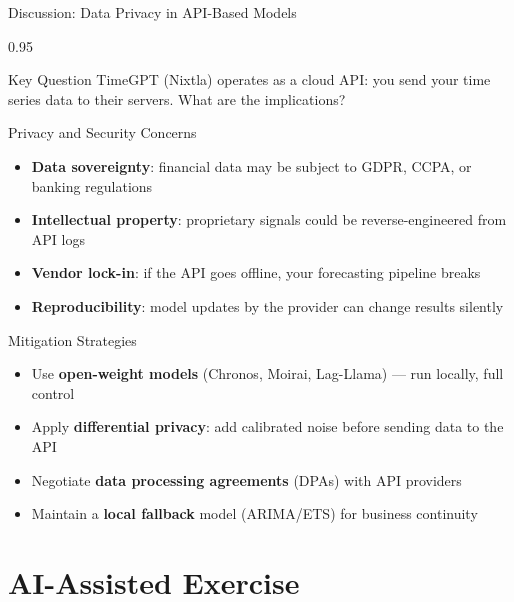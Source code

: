 \documentclass[9pt, aspectratio=169, t]{beamer}
\begin{document}
\begin{frame}{Discussion: Data Privacy in API-Based Models}
    \begin{cminipage}{0.95\textwidth}
    {\footnotesize
    \begin{alertblock}{Key Question}
        TimeGPT (Nixtla) operates as a cloud API: you send your time series data to their servers. What are the implications?
    \end{alertblock}
    \begin{block}{Privacy and Security Concerns}
        \begin{itemize}\setlength{\itemsep}{0pt}
            \item \textbf{Data sovereignty}: financial data may be subject to GDPR, CCPA, or banking regulations
            \item \textbf{Intellectual property}: proprietary signals could be reverse-engineered from API logs
            \item \textbf{Vendor lock-in}: if the API goes offline, your forecasting pipeline breaks
            \item \textbf{Reproducibility}: model updates by the provider can change results silently
        \end{itemize}
    \end{block}
    \begin{exampleblock}{Mitigation Strategies}
        \begin{itemize}\setlength{\itemsep}{0pt}
            \item Use \textbf{open-weight models} (Chronos, Moirai, Lag-Llama) --- run locally, full control
            \item Apply \textbf{differential privacy}: add calibrated noise before sending data to the API
            \item Negotiate \textbf{data processing agreements} (DPAs) with API providers
            \item Maintain a \textbf{local fallback} model (ARIMA/ETS) for business continuity
        \end{itemize}
    \end{exampleblock}
    }
    \end{cminipage}
\end{frame}

\section{AI-Assisted Exercise}
\end{document}
